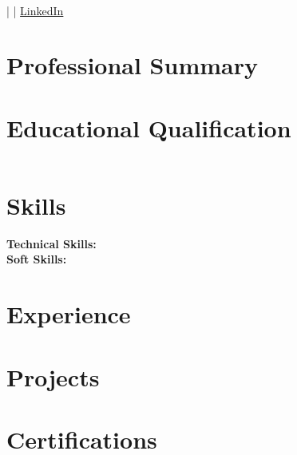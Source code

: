 \documentclass[10pt]{article}
\begin{document}
\begin{center}
    {\LARGE \textbf{}} \\
    \vspace{2pt}
    \href{mailto:}{} \quad | \quad  \quad | \quad \href{#}{LinkedIn}
\end{center}

\vspace{4pt}
\section*{Professional Summary}


\vspace{4pt}
\section*{Educational Qualification}
\begin{tabularx}{\linewidth}{@{}lX@{}}

\end{tabularx}

\vspace{4pt}
\section*{Skills}

\textbf{Technical Skills:} \\


\vspace{6pt}
\textbf{Soft Skills:} \\


\vspace{4pt}
\section*{Experience}



\vspace{4pt}
\section*{Projects}



\vspace{4pt}
\section*{Certifications}
\end{document}
